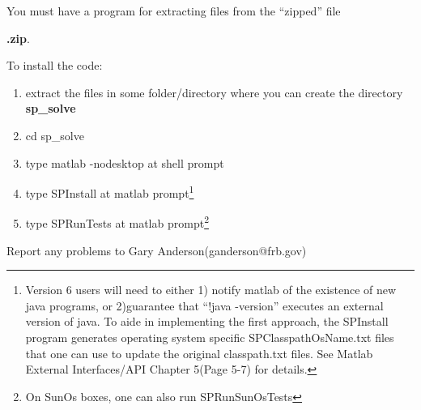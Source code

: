 You must have a program for
extracting files from the ``zipped'' file 

{\bf \sps.zip}.


To install the code:
\begin{enumerate}
\item extract the files in some folder/directory
where you can  create the directory {\bf sp\_solve}
\item cd sp\_solve
\item type matlab -nodesktop at shell prompt
\item type SPInstall at matlab prompt\footnote{Version 6 users will
need to either 1) notify matlab of the existence of new java programs, or
2)guarantee that ``!java -version'' executes an external version of java.
To aide in implementing the first approach,
the SPInstall program generates operating system specific
SPClasspathOsName.txt files that one can use to update the
original classpath.txt files.  See Matlab External Interfaces/API
Chapter 5(Page 5-7) for details.}
\item type SPRunTests  at matlab prompt\footnote{On SunOs boxes, one can
also run SPRunSunOsTests}
\end{enumerate}

Report any problems to Gary Anderson(ganderson@frb.gov)


